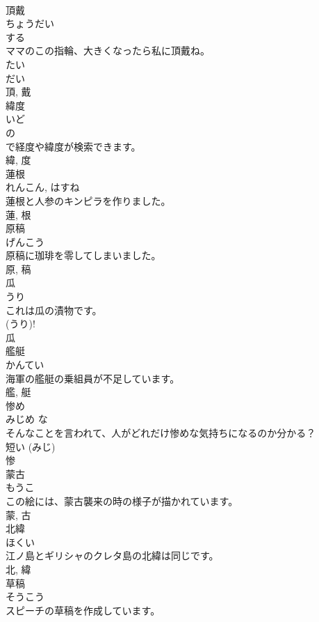 \documentclass[8pt]{extreport}
\begin{document}
\begin{CJK}{UTF8}{min}
\\	頂戴	
\\	ちょうだい	
\\	する 
\\	ママのこの指輪、大きくなったら私に頂戴ね。	
\\	たい 
\\	だい 
\\	頂, 戴	
\\	緯度	
\\	いど	
\\	の 
\\	で経度や緯度が検索できます。	
\\	緯, 度	
\\	蓮根	
\\	れんこん, はすね	
\\	蓮根と人参のキンピラを作りました。	
\\	蓮, 根	
\\	原稿	
\\	げんこう	
\\	原稿に珈琲を零してしまいました。	
\\	原, 稿	
\\	瓜	
\\	うり	
\\	これは瓜の漬物です。	
\\	(うり)! 
\\	瓜	
\\	艦艇	
\\	かんてい	
\\	海軍の艦艇の乗組員が不足しています。	
\\	艦, 艇	
\\	惨め	
\\	みじめ	な 
\\	そんなことを言われて、人がどれだけ惨めな気持ちになるのか分かる？	
\\	短い (みじ) 
\\	惨	
\\	蒙古	
\\	もうこ	
\\	この絵には、蒙古襲来の時の様子が描かれています。	
\\	蒙, 古	
\\	北緯	
\\	ほくい	
\\	江ノ島とギリシャのクレタ島の北緯は同じです。	
\\	北, 緯	
\\	草稿	
\\	そうこう	
\\	スピーチの草稿を作成しています。	

\end{CJK}
\end{document}
